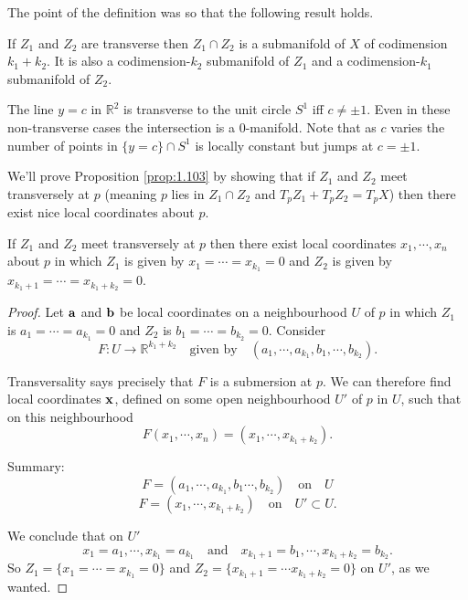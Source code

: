 \documentclass[a4paper,11pt]{article}
\begin{document}
	The point of the definition was so that the following result holds.

	\begin{prop}
		If $Z_1$ and $Z_2$ are transverse then $Z_1 \cap Z_2$ is a submanifold of $X$ of codimension $k_1 + k_2$. It is also a codimension-$k_2$ submanifold of $Z_1$ and a codimension-$k_1$ submanifold of $Z_2$.
		\label{prop:1.103}
	\end{prop}

	\begin{ex}
		The line $y = c$ in $\mathbb{R}^2$ is transverse to the unit circle $S^1$ iff $c \neq \pm 1$. Even in these non-transverse cases the intersection is a 0-manifold. Note that as $c$ varies the number of points in $\{y=c\}\cap S^1$ is locally constant but jumps at $c = \pm 1$.
	\end{ex}

	We'll prove Proposition \ref{prop:1.103} by showing that if $Z_1$ and $Z_2$ meet transversely at $p$ (meaning $p$ lies in $Z_1 \cap Z_2$ and $T_p Z_1 + T_p Z_2 = T_p X$) then there exist nice local coordinates about $p$.

	\begin{lem}
		If $Z_1$ and $Z_2$ meet transversely at $p$ then there exist local coordinates $x_1, \cdots, x_n$ about $p$ in which $Z_1$ is given by $x_1 = \cdots = x _{k_1} = 0$ and $Z_2$ is given by $x _{k_1 + 1} = \cdots = x _{k_1 + k_2} = 0$.
	\end{lem}

	\begin{proof}
		Let $\vb a$ and $\vb b$ be local coordinates on a neighbourhood $U$ of $p$ in which $Z_1$ is $a_1 = \cdots = a _{k_1} = 0$ and $Z_2$ is $b_1 = \cdots = b _{k_2} = 0$. Consider
		\[
			F: U \to \mathbb{R} ^{k_1 + k_2} \quad \text{given by} \quad (a_1, \cdots, a _{k_1}, b_1, \cdots, b _{k_2}).
		\]
		
		Transversality says precisely that $F$ is a submersion at $p$. We can therefore find local coordinates $\vb x$, defined on some open neighbourhood $U'$ of $p$ in $U$, such that on this neighbourhood
		\[
			F(x_1, \cdots, x_n) = (x_1, \cdots, x _{k_1 + k_2}).
		\]
		
		Summary:
		\[
			F = (a_1,\cdots, a _{k_1}, b_1 \cdots, b _{k_2}) \quad \text{on} \quad U
		\]
		\[
			F = (x_1, \cdots, x _{k_1 + k_2}) \quad \text{on} \quad U' \subset U.
		\]
		
		We conclude that on $U'$
		\[
			x_1 = a_1, \cdots, x _{k_1} = a _{k_1} \quad \text{and} \quad x _{k_1 + 1} = b_1, \cdots, x _{k_1 + k_2} = b _{k_2}.
		\]
		So $Z_1 = \{x_1 = \cdots = x _{k_1} = 0\}$ and $Z_2 = \{x _{k_1 + 1} = \cdots x _{k_1 + k_2} = 0\}$ on $U'$, as we wanted.
	\end{proof}
\end{document}
